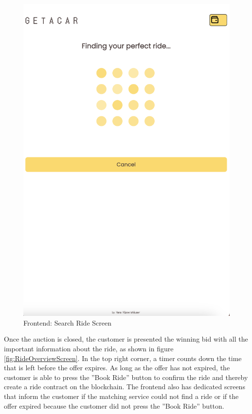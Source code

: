 \begin{figure}[H]
\begin{minipage}{0.45\linewidth}
        \includegraphics[width=\linewidth]{data/ffss/4.png}
        \caption{Frontend: Search Ride Screen}
        \label{fig:SearchRideScreen}
    \end{minipage}
    
\end{figure}

Once the auction is closed, the customer is presented the winning bid with all the important information about the ride, as shown in figure \ref{fig:RideOverviewScreen}. In the top right corner, a timer counts down the time that is left before the offer expires. As long as the offer has not expired, the customer is able to press the ''Book Ride'' button to confirm the ride and thereby create a ride contract on the blockchain. The frontend also has dedicated screens that inform the customer if the matching service could not find a ride or if the offer expired because the customer did not press the ''Book Ride'' button.

